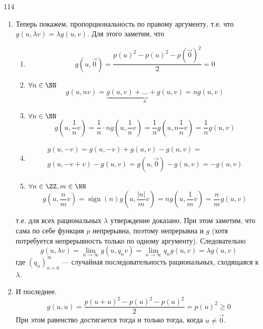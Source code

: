 \documentclass[12pt,a4paper]{article}
\DeclareMathOperator{\sign}{sign}
\begin{document}
\begin{problem}{114}
\begin{enumerate}
            \item Теперь покажем, пропорциональность по правому аргументу, т.е. что $g(u, \lambda v) = \lambda g(u, v)$. Для этого заметим, что
                \begin{enumerate}
                    \item \[g(u, \overrightarrow{0}) = \frac{p(u)^2 - p(u)^2 - p(\overrightarrow{0})^2}{2} = 0\]
                    \item $\forall n \in \NN$ \[g(u, nv) = \underbrace{g(u, v) + \dots + g(u, v)}_n = n g(u, v)\]
                    \item $\forall n \in \NN$ \[g\left(u, \frac{1}{n}v\right) = \frac{1}{n} \cdot ng\left(u, \frac{1}{n}v\right) = \frac{1}{n} g\left(u, n\frac{1}{n}v\right) = \frac{1}{n} g(u, v)\]
                    \item 
                        \begin{multline*}
                            g(u, -v) = g(u, -v) + g(u, v) - g(u, v) =\\
                            g(u, -v + v) - g(u, v) = g(u, \overrightarrow{0}) - g(u, v) = -g(u, v)
                        \end{multline*}
                    \item $\forall n \in \ZZ, m \in \NN$ \[g\left(u, \frac{n}{m} v\right) = \sign(n)g\left(u, \frac{|n|}{m} v\right) = n g\left(u, \frac{1}{m} v\right) = \frac{n}{m} g\left(u, v\right)\]
                \end{enumerate}
                т.е. для всех рациональных $\lambda$ утверждение доказано. При этом заметим, что сама по себе функция $p$ непрерывна, поэтому непрерывна и $g$ (хотя потребуется непрерывность только по одному аргументу). Следовательно
                \[g(u, \lambda v) = \lim_{n \to \infty} g(u, q_n v) = \lim_{n \to \infty} q_n g(u, v) = \lambda g(u, v)\]
                где $(q_n)_{n=0}^\infty$ --- случайная последовательность рациональных, сходящаяся к $\lambda$.

            \item И последнее.
                \[g(u, u) = \frac{p(u + u)^2 - p(u)^2 - p(u)^2}{2} = p(u)^2 \geqslant 0\]
                При этом равенство достигается тогда и только тогда, когда $u \neq \overrightarrow{0}$.
        \end{enumerate}
    \end{problem}
\end{document}
